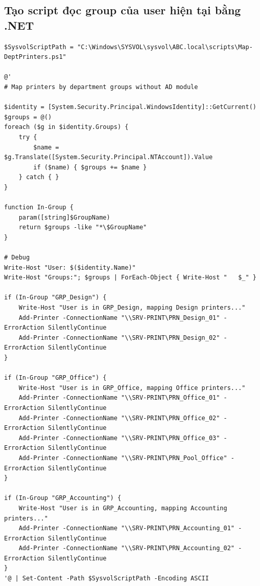 \subsection{Tạo script đọc group của user hiện tại bằng .NET}
\begin{lstlisting}[style=powershell]
$SysvolScriptPath = "C:\Windows\SYSVOL\sysvol\ABC.local\scripts\Map-DeptPrinters.ps1"
 
@'
# Map printers by department groups without AD module
 
$identity = [System.Security.Principal.WindowsIdentity]::GetCurrent()
$groups = @()
foreach ($g in $identity.Groups) {
    try {
        $name = $g.Translate([System.Security.Principal.NTAccount]).Value
        if ($name) { $groups += $name }
    } catch { }
}
 
function In-Group {
    param([string]$GroupName)
    return $groups -like "*\$GroupName"
}
 
# Debug
Write-Host "User: $($identity.Name)"
Write-Host "Groups:"; $groups | ForEach-Object { Write-Host "   $_" }
 
if (In-Group "GRP_Design") {
    Write-Host "User is in GRP_Design, mapping Design printers..."
    Add-Printer -ConnectionName "\\SRV-PRINT\PRN_Design_01" -ErrorAction SilentlyContinue
    Add-Printer -ConnectionName "\\SRV-PRINT\PRN_Design_02" -ErrorAction SilentlyContinue
}
 
if (In-Group "GRP_Office") {
    Write-Host "User is in GRP_Office, mapping Office printers..."
    Add-Printer -ConnectionName "\\SRV-PRINT\PRN_Office_01" -ErrorAction SilentlyContinue
    Add-Printer -ConnectionName "\\SRV-PRINT\PRN_Office_02" -ErrorAction SilentlyContinue
    Add-Printer -ConnectionName "\\SRV-PRINT\PRN_Office_03" -ErrorAction SilentlyContinue
    Add-Printer -ConnectionName "\\SRV-PRINT\PRN_Pool_Office" -ErrorAction SilentlyContinue
}
 
if (In-Group "GRP_Accounting") {
    Write-Host "User is in GRP_Accounting, mapping Accounting printers..."
    Add-Printer -ConnectionName "\\SRV-PRINT\PRN_Accounting_01" -ErrorAction SilentlyContinue
    Add-Printer -ConnectionName "\\SRV-PRINT\PRN_Accounting_02" -ErrorAction SilentlyContinue
}
'@ | Set-Content -Path $SysvolScriptPath -Encoding ASCII
\end{lstlisting}

